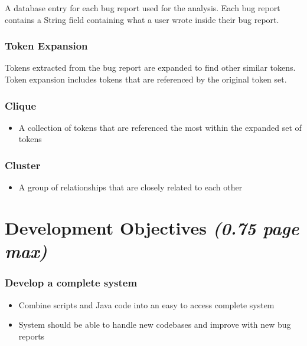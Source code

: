 \documentclass[12pt]{article}
\begin{document}
A database entry for each bug report used for the analysis. Each bug
report contains a String field containing what a user wrote inside their
bug report.

\subsubsection{Token Expansion}\label{token-expansion}

Tokens extracted from the bug report are expanded to find other similar
tokens. Token expansion includes tokens that are referenced by the
original token set.

\subsubsection{Clique}\label{clique}

\begin{itemize}
\tightlist
\item
  A collection of tokens that are referenced the most within the
  expanded set of tokens
\end{itemize}

\subsubsection{Cluster}\label{cluster}

\begin{itemize}
\tightlist
\item
  A group of relationships that are closely related to each other
\end{itemize}

\section{\texorpdfstring{Development Objectives \emph{(0.75 page
max)}}{Development Objectives (0.75 page max)}}\label{development-objectives-0.75-page-max}

\subsubsection{Develop a complete
system}\label{develop-a-complete-system}

\begin{itemize}
\tightlist
\item
  Combine scripts and Java code into an easy to access complete system
\item
  System should be able to handle new codebases and improve with new bug
  reports
\end{itemize}
\end{document}
